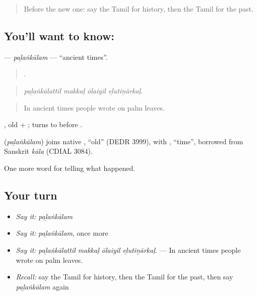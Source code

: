 \label{lesson:TA-C326-palankalam}



\begin{quote}
Before the new one: say the Tamil for history, then the Tamil for the past.
\end{quote}

\subsection*{You'll want to know: }
\textbf{} — \emph{paḻaṅkālam} — \textquotedblleft{}ancient times\textquotedblright{}.

\begin{quote}
   .
\end{quote}

\begin{quote}
\emph{paḻaṅkālattil makkaḷ ōlaiyil eḻutiṉārkaḷ.}
\end{quote}

\begin{quote}
In ancient times people wrote on palm leaves.
\end{quote}

, old + ;  turns to  before .

\begin{cousinweb}
\textbf{} (\emph{paḻaṅkālam}) joins native , \textquotedblleft{}old\textquotedblright{} (DEDR 3999), with , \textquotedblleft{}time\textquotedblright{}, borrowed from Sanskrit \emph{kāla} (CDIAL 3084).
\end{cousinweb}

\begin{grammarlens}[title={What you've built}]
One more word for telling what happened.
\end{grammarlens}

\subsection*{Your turn}
\begin{itemize}
\raggedright
  \item \emph{Say it:} \emph{paḻaṅkālam}
  \item \emph{Say it:} \emph{paḻaṅkālam}, once more
  \item \emph{Say it:} \emph{paḻaṅkālattil makkaḷ ōlaiyil eḻutiṉārkaḷ.} — In ancient times people wrote on palm leaves.
  \item \emph{Recall:} say the Tamil for history, then the Tamil for the past, then say \emph{paḻaṅkālam} again
\end{itemize}

